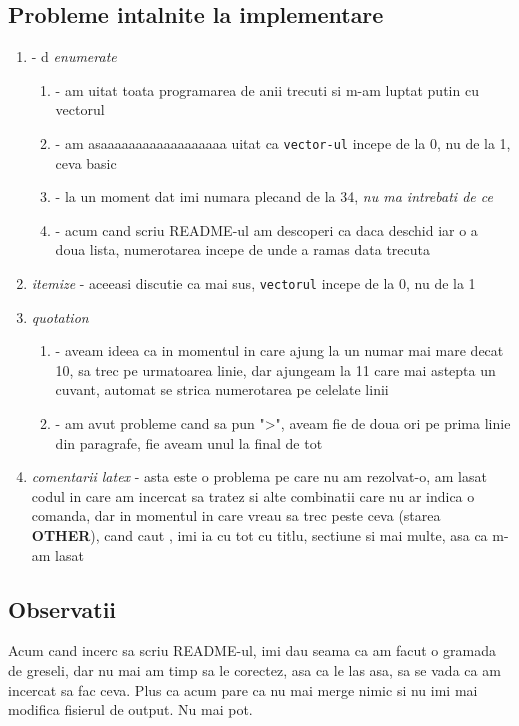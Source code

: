 \subsection{Probleme intalnite la implementare}
\begin{enumerate}
    \item - d \textit{enumerate} \begin{enumerate}
        \item - am uitat toata programarea de anii trecuti si m-am luptat putin cu vectorul
        \item - am asaaaaaaaaaaaaaaaaaa uitat ca \texttt{vector-ul} incepe de la 0, nu de la 1, ceva basic
        \item - la un moment dat imi numara plecand de la 34, \textit{nu ma intrebati de ce}
        \item - acum cand scriu README-ul am descoperi ca daca deschid iar o a doua lista, numerotarea incepe de unde a ramas data trecuta
        \end{enumerate}
    \item \textit{itemize} - aceeasi discutie ca mai sus, \texttt{vectorul} incepe de la 0, nu de la 1
    \item \textit{quotation} \begin{enumerate}
        \item - aveam ideea ca in momentul in care ajung la un numar mai mare decat 10, sa trec pe urmatoarea linie, dar ajungeam la 11 care mai astepta un cuvant, automat se strica numerotarea pe celelate linii
        \item - am avut probleme cand sa pun ">", aveam fie de doua ori pe prima linie din paragrafe, fie aveam unul la final de tot
        \end{enumerate}
    \item \textit{comentarii latex} - asta este o problema pe care nu am rezolvat-o, am lasat codul in care am incercat sa tratez si alte combinatii care nu ar indica o comanda, dar in momentul in care vreau sa trec peste ceva (starea \textbf{OTHER}), cand caut \texttt{\ceva}, imi ia cu tot cu titlu, sectiune si mai multe, asa ca m-am lasat
\end{enumerate}

\subsection{Observatii}
Acum cand incerc sa scriu README-ul, imi dau seama ca am facut o gramada de greseli, dar nu mai am timp sa le corectez, asa ca le las asa, sa se vada ca am incercat sa fac ceva. Plus ca acum pare ca nu mai merge nimic si nu imi mai modifica fisierul de output. Nu mai pot.

